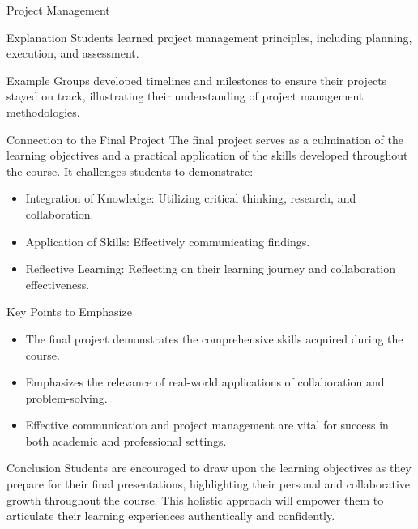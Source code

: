 \documentclass[aspectratio=169]{beamer}
\begin{document}
\begin{frame}[fragile]{Project Management}
    \begin{block}{Explanation}
        Students learned project management principles, including planning, execution, and assessment.
    \end{block}
    \begin{block}{Example}
        Groups developed timelines and milestones to ensure their projects stayed on track, illustrating their understanding of project management methodologies.
    \end{block}
\end{frame}

\begin{frame}[fragile]{Connection to the Final Project}
    The final project serves as a culmination of the learning objectives and a practical application of the skills developed throughout the course. It challenges students to demonstrate:
    
    \begin{itemize}
        \item Integration of Knowledge: Utilizing critical thinking, research, and collaboration.
        \item Application of Skills: Effectively communicating findings.
        \item Reflective Learning: Reflecting on their learning journey and collaboration effectiveness.
    \end{itemize}
\end{frame}

\begin{frame}[fragile]{Key Points to Emphasize}
    \begin{itemize}
        \item The final project demonstrates the comprehensive skills acquired during the course.
        \item Emphasizes the relevance of real-world applications of collaboration and problem-solving.
        \item Effective communication and project management are vital for success in both academic and professional settings.
    \end{itemize}
\end{frame}

\begin{frame}[fragile]{Conclusion}
    Students are encouraged to draw upon the learning objectives as they prepare for their final presentations, highlighting their personal and collaborative growth throughout the course. This holistic approach will empower them to articulate their learning experiences authentically and confidently.
\end{frame}
\end{document}
